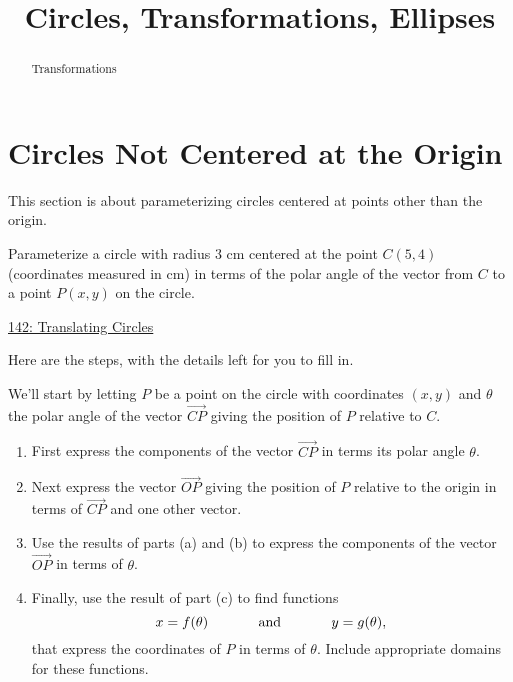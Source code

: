 \documentclass{ximera}
\title{Circles, Transformations, Ellipses}
\begin{document}
\begin{abstract}
Transformations
\end{abstract}
\maketitle


\section{Circles Not Centered at the Origin}
This section is about parameterizing circles centered at points other than the origin.

\begin{question}  \label{Ex:sdfdsfdfL}

Parameterize a circle with radius $3$ cm centered at the point $C(5,4)$ (coordinates measured in cm) in terms of the polar angle of the vector from $C$ to a point $P(x,y)$ on the circle.

\begin{onlineOnly}
    \begin{center}
\end{center}
\end{onlineOnly}

\href{https://www.desmos.com/calculator/pcndel98wg}{142: Translating Circles}


\begin{explanation} 

Here are the steps, with the details left for you to fill in.

We'll start by letting $P$ be a point on the circle with coordinates $(x,y)$ and $\theta$ the polar angle of the vector $\overrightarrow{CP}$ giving the position of $P$ relative to $C$.

\begin{enumerate}
\item First express the components of the vector $\overrightarrow{CP}$ in terms its polar angle $\theta$.

\item Next express the vector $\overrightarrow{OP}$ giving the position of $P$ relative to the origin in terms of $\overrightarrow{CP}$ and one other vector.

\item Use the results of parts (a) and (b) to express the components of the vector $\overrightarrow{OP}$ in terms of $\theta$.

\item Finally, use the result of part (c) to find functions
\[
    x = f(\theta)  \hskip 0.5 in \text{and} \hskip 0.5in  y=g(\theta) ,
\]
that express the coordinates of $P$ in terms of $\theta$. Include appropriate domains for these functions. 
\end{enumerate}

\end{explanation}
\end{question}
\end{document}
